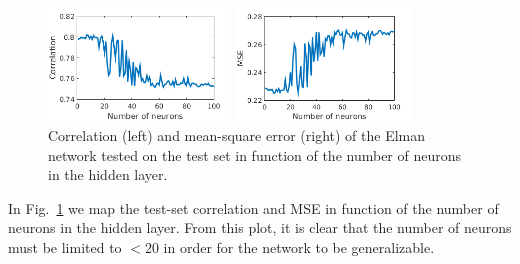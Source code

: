 \documentclass[10pt,a4paper]{article}
\begin{document}
\begin{figure}[tbh]
\centering
\begin{minipage}{0.4\textwidth}
\includegraphics[height=3cm]{figs/correlation_map.png}
\end{minipage}%
\begin{minipage}{0.4\textwidth}
\includegraphics[height=3cm]{figs/mse_map.png}
\end{minipage}%
\caption{Correlation (left) and mean-square error (right) of the Elman network tested on the test set in function of the number of neurons in the hidden layer. \label{fig:elman}}
\end{figure}

In Fig.~\ref{fig:elman} we map the test-set correlation and MSE in function of the number of neurons in the hidden layer. From this plot, it is clear that the number of neurons must be limited to $< 20$ in order for the network to be generalizable.
\end{document}
